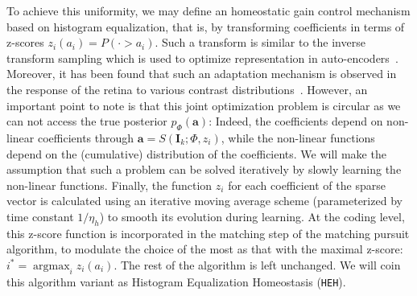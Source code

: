 \documentclass[a4paper, 11pt, draft]{article} %
\DeclareMathOperator*{\ArgMax}{\arg\max}   %
\newcommand{\coef}{\mathbf{a}} %
\newcommand{\image}{\mathbf{I}} %
\newcommand{\dico}{\Phi} %
\begin{document}
To achieve this uniformity, we may define an homeostatic gain control mechanism based on histogram equalization, that is, by transforming coefficients in terms of z-scores $z_i(a_i) = P( \cdot > a_i)$. Such a transform is similar to the inverse transform sampling which is used to optimize representation in auto-encoders~\citep{Ranzatto}.
Moreover, it has been found that such an adaptation mechanism is observed in the response of the retina to various contrast distributions~\citep{Laughlin81}. However, an important point to note is that this joint optimization problem is circular as we can not access the true posterior $p_\dico(\coef)$: Indeed, the coefficients depend on non-linear coefficients through $\coef = S(\image_k; \dico, z_i)$, while the non-linear functions depend on the (cumulative) distribution of the coefficients.
We will make the assumption that such a problem can be solved iteratively by slowly learning the non-linear functions.
Finally, the function $z_i$ for each coefficient of the sparse vector is calculated using an iterative moving average scheme (parameterized by time constant $1/\eta_h$) to smooth its evolution during learning. At the coding level, this z-score function is incorporated in the matching step of the matching pursuit algorithm, to modulate the choice of the most as that with the maximal z-score: $i^\ast = \ArgMax_i z_i(a_i)$. The rest of the algorithm is left unchanged.
We will coin this algorithm variant as Histogram Equalization Homeostasis (\texttt{HEH}).
\end{document}
